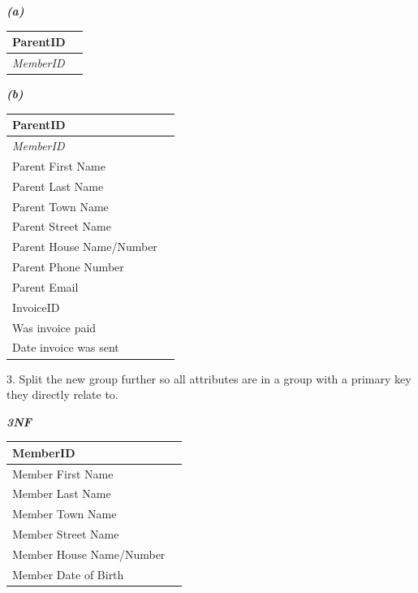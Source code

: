 \textbf{\textit{(a)}}
\begin{center}
	\begin{tabular}{|p{4cm}|p{4cm}|}
		\hline	
		\textbf{ParentID} \\ \hline
		\textit{MemberID} \\ \hline
	\end{tabular}
\end{center}

\textbf{\textit{(b)}}
\begin{center}
	\begin{tabular}{|p{4cm}|p{4cm}|}
		\hline
		\textbf{ParentID} \\ \hline
		\textit{MemberID} \\ \hline
		Parent First Name \\ \hline
		Parent Last Name \\ \hline
		Parent Town Name \\ \hline
		Parent Street Name \\ \hline
		Parent House Name/Number \\ \hline
		Parent Phone Number \\ \hline
		Parent Email \\ \hline
		InvoiceID \\ \hline
		Was invoice paid \\ \hline
		Date invoice was sent \\ \hline
	\end{tabular}
\end{center}

3. Split the new group further so all attributes are in a group with a primary key they directly relate to.

\textbf{\textit{3NF}}
\begin{center}
	\begin{tabular}{|p{4cm}|p{4cm}|}
		\hline
		\textbf{MemberID} \\ \hline
		Member First Name  \\ \hline
		Member Last Name \\ \hline
		Member Town Name \\ \hline
		Member Street Name \\ \hline
		Member House Name/Number \\ \hline
		Member Date of Birth \\ \hline		
	\end{tabular}
\end{center}

